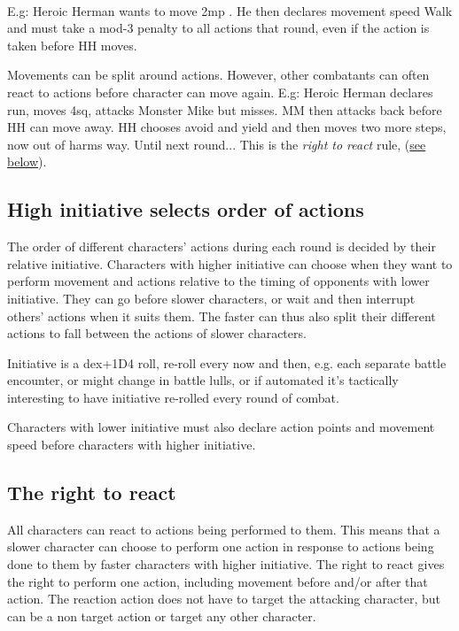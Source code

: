 \

E.g: Heroic Herman wants to move 2mp . He then declares movement speed Walk and must take a mod-3 penalty to all actions that round, even if the action is taken before HH moves.

Movements can be split around actions. However, other combatants can often react to actions before character can move again. E.g: Heroic Herman declares run, moves 4sq, attacks Monster Mike but misses. MM then attacks back before HH can move away. HH chooses avoid and yield and then moves two more steps, now out of harms way. Until next round... This is the \emph{right to react} rule, (\hyperref[righttoreact]{see below}).


\subsection*{High initiative selects order of actions}
The order of different characters' actions during each round is decided by their relative initiative. Characters with higher initiative can choose when they want to perform movement and actions relative to the timing of opponents with lower initiative. They can go before slower characters, or wait and then interrupt others' actions when it suits them. The faster can thus also split their different actions to fall between the actions of slower characters.

Initiative is a dex+1D4 roll, re-roll every now and then, e.g. each separate battle encounter, or might change in battle lulls, or if automated it's tactically interesting to have initiative re-rolled every round of combat.

Characters with lower initiative must also declare action points and movement speed before characters with higher initiative.


\subsection*{The right to react}
\label{righttoreact}
All characters can react to actions being performed to them. This means that a slower character can choose to perform one action in response to actions being done to them by faster characters with higher initiative.
The right to react gives the right to perform one action, including movement before and/or after that action. The reaction action does not have to target the attacking character, but can be a non target action or target any other character.

